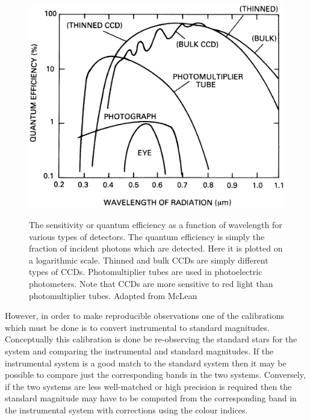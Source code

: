 \documentclass[twoside,11pt]{article}
\begin{document}
\begin{figure}[htbp]
   \centering 
   \includegraphics[totalheight=3in]{sc6_sensitivity.ps}
   \begin{quote}
   \caption[The wavelength sensitivity of various types of detectors]
    {The sensitivity or quantum efficiency as a function of wavelength for
    various types of detectors.  The quantum efficiency is simply the
    fraction of incident photons which are detected.  Here it is plotted
    on a logarithmic scale.  Thinned and bulk CCDs are simply different
    types of CCDs.  Photomultiplier tubes are used in photoelectric
    photometers.  Note that CCDs are more sensitive to red light than
    photomultiplier tubes.  Adapted from McLean\cite{MCLEAN97}
   \label{SENSITIVITY} }
   \end{quote}
\end{figure}

However, in order to make reproducible observations one of the
calibrations which must be done is to convert instrumental to standard
magnitudes.  Conceptually this calibration is done be re-observing
the standard stars for the system and comparing the instrumental and
standard magnitudes.  If the instrumental system is a good match to the
standard system then it may be possible to compare just the
corresponding bands in the two systems.  Conversely, if the two systems
are less well-matched or high precision is required then the standard
magnitude may have to be computed from the corresponding band in the
instrumental system with corrections using the colour indices.
\end{document}
